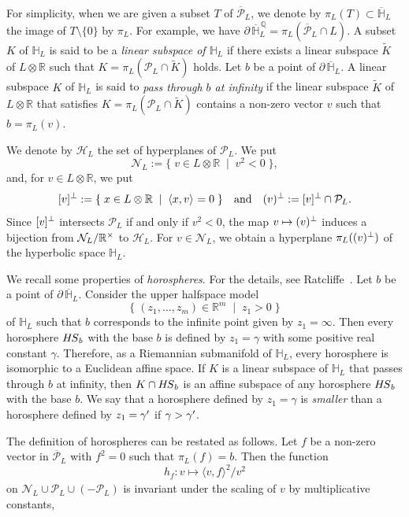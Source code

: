\documentclass{amsart}
\theoremstyle{plain}
\theoremstyle{definition}
\theoremstyle{remark}
\numberwithin{equation}{section}
\numberwithin{table}{section}
\numberwithin{figure}{section}
\renewcommand{\H}{\mathord{\mathbb H}}
\newcommand{\Q}{\mathord{\mathbb  Q}}
\newcommand{\R}{\mathord{\mathbb R}}
\newcommand{\HHH}{\mathord{\mathcal H}}
\newcommand{\NNN}{\mathord{\mathcal N}}
\newcommand{\PPP}{\mathord{\mathcal P}}
\newcommand{\set}[2]{\{\; {#1} \; \mid \; {#2} \;  \}}
\newcommand{\tensor}{\otimes}
\newcommand{\sprime}{\sp\prime}
\newcommand{\sptimes}{\sp{\times}}
\newcommand{\sperp}{\sp{\perp}}
\newcommand{\bdr}{\partial\,}
\newcommand{\rmand}{\textrm{and}}
\newcommand{\quand}{\quad\rmand\quad}
\newcommand{\intM}[2]{\langle{#1}\rangle_{#2}}
\newcommand{\clPPP}{\overline{\PPP}}
\newcommand{\clH}{\overline{\H}}
\newcommand{\bdrclH}{\bdr\clH}
\newcommand{\bdrclHQ}{\bdr\clH^{\,\Q}}
\newcommand{\HS}{\mathord{H\hskip -1pt S}}
\begin{document}
For simplicity,
when we are given a subset $T$ of $\clPPP_L$,
we denote by $\pi_L(T)\subset\clH_L$ the image of  $T\setminus\{0\}$ by $\pi_L$.  
For example,  we have $\bdrclHQ_L=\pi_L(\clPPP_L\cap L)$.
A subset $K$ of $\H_L$ is said to be a \emph{linear subspace of $\H_L$}
if there exists a linear subspace $\tilde{K}$ of $L\tensor\R$
such that $K=\pi_L(\PPP_L\cap \tilde{K})$ holds.
Let $b$ be a point of $\bdr\clH_L$.
A linear subspace $K$ of $\H_L$ is said to \emph{pass through $b$ at infinity}
if the linear subspace $\tilde{K}$ of $L\tensor\R$
that satisfies $K=\pi_L(\PPP_L\cap \tilde{K})$ contains a non-zero vector $v$ such that $b=\pi_L(v)$.
\par
We denote by 
$\HHH_L$ the set of hyperplanes of $\PPP_L$.
We put
$$
\NNN_L:=\set{v\in L\tensor \R}{v^2<0}, 
$$
and, for $v\in L\tensor\R$, we put
$$
[v]\sperp:=\set{x\in L\tensor \R}{\intM{x, v}{}=0}
\quand
(v)\sperp:=[v]\sperp\cap \PPP_L.
$$
Since $[v]\sperp$ intersects $\PPP_L$ if and only if $v^2<0$, the map $v\mapsto (v)\sperp$ 
induces a bijection 
from $\NNN_L/\R\sptimes$ to $\HHH_L$. 
For $v\in \NNN_L$, we obtain a hyperplane $\pi_L((v)\sperp)$ of the hyperbolic space $\H_L$.
\par
We recall some properties of \emph{horospheres}.
For the details, 
see  Ratcliffe~\cite[Chapter 4]{MR1299730}.
Let $b$ be a point of $\bdrclH_L$.
Consider the upper halfspace model
%
\begin{equation}\label{eq:upper}
\set{(z_1, \dots, z_m)\in \R^m}{z_1>0}
\end{equation}
%
of $\H_L$ such that $b$ corresponds to the infinite point given by $z_1=\infty$.
Then every horosphere $\HS_b$ with the base $b$ is defined by
$z_1=\gamma$
with some positive real constant $\gamma$.
Therefore, 
as a Riemannian submanifold of $\H_L$,
every horosphere is isomorphic to a Euclidean affine space.
If $K$ is a linear subspace of $\H_L$ that passes through $b$ at infinity, 
then $K\cap \HS_b$ is an affine subspace of any horosphere $\HS_b$ with the base $b$.
We say that a horosphere defined by $z_1=\gamma$ is \emph{smaller} than
a horosphere defined by $z_1=\gamma\sprime$ if $\gamma>\gamma\sprime$.
\par
The definition of horospheres can be restated as follows.
Let $f$ be a non-zero vector in $\clPPP_L$ with $f^2=0$ such that $\pi_L(f)=b$.
Then the function  
$$
h_f\colon v\mapsto \intM{v, f}{}^2/v^2
$$
on $\NNN_L\cup \PPP_L\cup (-\PPP_L)$ is invariant under the scaling of $v$ by multiplicative constants,
\end{document}
